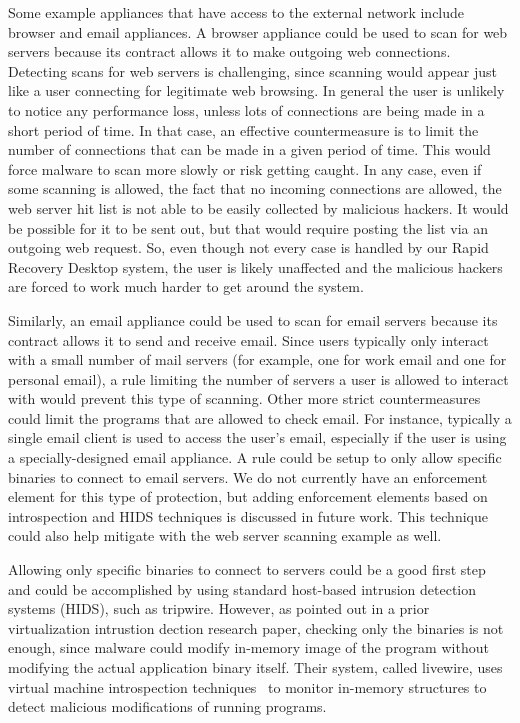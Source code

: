 Some example appliances that have access to the external network include browser and email appliances. A browser appliance could be used to scan for web servers because its contract allows it to make outgoing web connections. Detecting scans for web servers is challenging, since scanning would appear just like a user connecting for legitimate web browsing. In general the user is unlikely to notice any performance loss, unless lots of connections are being made in a short period of time. In that case, an effective countermeasure is to limit the number of connections that can be made in a given period of time. This would force malware to scan more slowly or risk getting caught. In any case, even if some scanning is allowed, the fact that no incoming connections are allowed, the web server hit list is not able to be easily collected by malicious hackers. It would be possible for it to be sent out, but that would require posting the list via an outgoing web request. So, even though not every case is handled by our Rapid Recovery Desktop system, the user is likely unaffected and the malicious hackers are forced to work much harder to get around the system. 

Similarly, an email appliance could be used to scan for email servers because its contract allows it to send and receive email. Since users typically only interact with a small number of mail servers (for example, one for work email and one for personal email), a rule limiting the number of servers a user is allowed to interact with would prevent this type of scanning. Other more strict countermeasures could limit the programs that are allowed to check email. For instance, typically a single email client is used to access the user's email, especially if the user is using a specially-designed email appliance. A rule could be setup to only allow specific binaries to connect to email servers. We do not currently have an enforcement element for this type of protection, but adding enforcement elements based on introspection and HIDS techniques is discussed in future work. This technique could also help mitigate with the web server scanning example as well.

Allowing only specific binaries to connect to servers could be a good first step and could be accomplished by using standard host-based intrusion detection systems (HIDS), such as tripwire\cite{kim_tripwire_1994}. However, as pointed out in a prior virtualization intrustion dection research paper\cite{VMI_IDS_2003}, checking only the binaries is not enough, since malware could modify in-memory image of the program without modifying the actual application binary itself. Their system, called livewire, uses virtual machine introspection techniques~\cite{xenaccess_07,vmsafe_news_2008} to monitor in-memory structures to detect malicious modifications of running programs.

